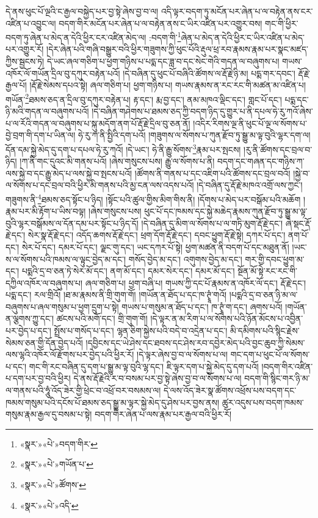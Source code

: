 དེ་ནས་ཕུང་པོ་ལྔའི་ང་རྒྱལ་བསྐྱེད་པར་བྱ་སྟེ་ཞེས་བྱ་བ་ལ། འདི་ལྟར་བདག་ཏུ་མངོན་པར་ཞེན་པ་ལ་བརྟེན་ནས་ངར་འཛིན་པ་འབྱུང་ལ། བདག་གིར་མངོན་པར་ཞེན་པ་ལ་བརྟེན་ནས་ང་ཡིར་འཛིན་པར་འགྱུར་བས། གང་གི་ཕྱིར་བདག་ཏུ་ཞེན་པ་མེད་ན་དེའི་ཕྱིར་ངར་འཛིན་མེད་ལ། :བདག་གི་\footnote{«སྣར་»«པེ་»བདག་གིར་}ཞེན་པ་མེད་ན་དེའི་ཕྱིར་ང་ཡིར་འཛིན་པ་མེད་པར་འགྱུར་རོ། །དེར་ཞེན་པའི་གཞི་བསྒྱུར་བའི་ཕྱིར་གཟུགས་ཀྱི་ཕུང་པོའི་རྡུལ་ཕྲ་རབ་རྣམས་རྣམ་པར་སྣང་མཛད་ཀྱིས་སྦྱངས་ཏེ། དེ་ཡང་ཞལ་གཅིག་པ་ཕྱག་གཉིས་པ་པདྨ་དང་ཟླ་བ་དང་སེང་གེའི་གདན་ལ་བཞུགས་པ། གཡས་འཁོར་ལོ་གཡོན་དྲིལ་བུ་དཀུར་བརྟེན་པའོ། །དེ་བཞིན་དུ་ཕུང་པོ་བཞིའི་ཚོགས་ལ་རྡོ་རྗེ་ཉི་མ། པདྨ་གར་དབང་། རྡོ་རྗེ་རྒྱལ་པོ། །རྡོ་རྗེ་སེམས་དཔའ་སྟེ། ཞལ་གཅིག་པ། ཕྱག་གཉིས་པ། གཡས་རྣམས་ན་རང་རང་གི་མཚན་མ་འཛིན་པ། གཡོན་\footnote{«སྣར་»«པེ་»གཡོན་པ་}ཐམས་ཅད་ན་དྲིལ་བུ་དཀུར་བརྟེན་པ། རྟ་དང་། རྨ་བྱ་དང་། ནམ་མཁའ་ལྡིང་དང་། གླང་པོ་དང་། པདྨ་དང་ཉི་མའི་གདན་ལ་བཞུགས་པའོ། །དེ་བཞིན་གཤེགས་པ་ཐམས་ཅད་ཀྱི་བདག་ཉིད་དུ་གྱུར་པ་ནི་དཔལ་ཧེ་རུ་ཀའོ་ཞེས་པ་ལ་རོའི་གདན་ལ་བཞུགས་པ་སྐུ་མདོག་ནག་པོ་རྡོ་རྗེ་དྲིལ་བུ་ཅན་ནོ། །འདིར་རིགས་ལྔ་ནི་ཕུང་པོ་ལྔ་ལ་སོགས་པ་བྱེ་བྲག་གི་དག་པ་ཡིན་ལ། ཧེ་རུ་ཀ་ནི་སྤྱིའི་དག་པའོ། །གཟུགས་ལ་སོགས་པ་ཀུན་རྫོབ་ཏུ་སྒྱུ་མ་ལྟ་བུའི་ལྷར་དག་ལ། དོན་དམ་སྐྱེ་མེད་དུ་དག་པ་དཔལ་ཧེ་རུ་ཀའོ། །དེ་ཡང་། ཧེ་ནི་རྒྱུ་སོགས་\footnote{«སྣར་»«པེ་»ཚོགས་}རྣམ་པར་སྤངས། །རུ་ནི་ཚོགས་དང་བྲལ་བ་ཉིད། །ཀ་ནི་གང་དུའང་མི་གནས་པའོ། །ཞེས་གསུངས་པས། རྒྱུ་ལ་སོགས་པ་ནི། བདག་དང་གཞན་དང་གཉིས་ཀ་ལས་སྐྱེ་བ་དང་རྒྱུ་མེད་པ་ལས་སྐྱེ་བ་སྤངས་པའོ། །ཚོགས་ནི་གནས་པ་དང་འཇིག་པའི་ཚོགས་དང་བྲལ་བའོ། །སྐྱེ་བ་ལ་སོགས་པ་དང་བྲལ་བའི་ཕྱིར་མི་གནས་པའི་མྱ་ངན་ལས་འདས་པའོ། །དེ་བཞིན་དུ་རྡོ་རྗེ་མཁའ་འགྲོ་ལས་ཀྱང་། གཟུགས་ནི་\footnote{«སྣར་»«པེ་»འདི་}ཐམས་ཅད་སྟོང་པ་ཉིད། །སྟོང་པའི་ཚུལ་གྱིས་མིག་གིས་ནི། །དོགས་པ་མེད་པར་བསྒོམ་པའི་མཆོག །རྣམ་པར་མི་རྟོག་པ་ཡིས་བལྟ། །ཞེས་གསུངས་པས། ཕུང་པོ་དང་ཁམས་དང་སྐྱེ་མཆེད་རྣམས་ཀུན་རྫོབ་ཏུ་སྒྱུ་མ་ལྟ་བུའི་ལྷར་བསྒོམས་ལ་དོན་དམ་པར་སྟོང་པ་ཉིད་དོ། །དེ་བཞིན་དུ་མིག་ལ་སོགས་པ་ལ་གཏི་མུག་རྡོ་རྗེ་དང་། ཞེ་སྡང་རྡོ་རྗེ་དང་། སེར་སྣ་རྡོ་རྗེ་དང་། འདོད་ཆགས་རྡོ་རྗེ་དང་། ཕྲག་དོག་རྡོ་རྗེ་དང་། དབང་ཕྱུག་རྡོ་རྗེ་སྟེ། དཀར་པོ་དང་། ནག་པོ་དང་། སེར་པོ་དང་། དམར་པོ་དང་། ལྗང་གུ་དང་། ཡང་དཀར་པོ་སྟེ། ཕྱག་མཚན་ནི་བདག་པོ་དང་མཐུན་ནོ། །ཡང་ས་ལ་སོགས་པའི་ཁམས་ལ་ལྟུང་བྱེད་མ་དང་། གསོད་བྱེད་མ་དང་། འགུགས་བྱེད་མ་དང་། གར་གྱི་དབང་ཕྱུག་མ་དང་། པདྨའི་དྲ་བ་ཅན་ཏེ་སེར་མོ་དང་། ནག་མོ་དང་། དམར་སེར་དང་། དམར་མོ་དང་། སྔོན་མོ་སྟེ་རང་རང་གི་དཀྱིལ་འཁོར་ལ་བཞུགས་པ། ཞལ་གཅིག་པ། ཕྱག་བཞི་པ། གཡས་ཀྱི་དང་པོ་རྣམས་ན་འཁོར་ལོ་དང་། རྡོ་རྗེ་དང་། པདྨ་དང་། རལ་གྲིའོ། །ཐ་མ་རྣམས་ནི་གྲི་གུག་གོ། །གཡོན་ན་ཐོད་པ་དང་ཁ་ཊྭཱཾ་གའོ། །པདྨའི་དྲ་བ་ཅན་ཉི་མ་ལ་བཞུགས་པ་ཞལ་གསུམ་པ་ཕྱག་དྲུག་པ་སྟེ། གཡས་པ་གསུམ་ན་ཐོད་པ་དང་། ཁ་ཊྭཱཾ་ག་དང་། ཞགས་པའོ། །གཡོན་ན་ལྕགས་ཀྱུ་དང་། ཚངས་པའི་མགོ་དང་། གྲི་གུག་གོ། །དེ་ལྟར་ན་མ་རིག་པ་ལ་སོགས་པའི་ཉོན་མོངས་པ་འབྱིན་པར་བྱེད་པ་དང་། སྤྲོས་པ་གསོད་པ་དང་། ལྷན་ཅིག་སྐྱེས་པའི་བདེ་བ་འདྲེན་པ་དང་། མི་དམིགས་པའི་སྙིང་རྗེས་སེམས་ཅན་གྱི་དོན་བྱེད་པའོ། །དབྱིངས་དང་ཡེ་ཤེས་དང་ཐབས་དང་ཤེས་རབ་དབྱེར་མེད་པའི་བྱང་ཆུབ་ཀྱི་སེམས་ལས་ལྷའི་འཁོར་ལོ་རྫོགས་པར་བྱེད་པའི་ཕྱིར་རོ། །དེ་ལྟར་ཞེས་བྱ་བ་ལ་སོགས་པ་ལ། གང་དག་པ་ཕུང་པོ་ལ་སོགས་པ་དང་། གང་གི་རང་བཞིན་དུ་དག་པ་སྒྱུ་མ་ལྟ་བུའི་ལྷ་དང་། ཇི་ལྟར་དག་པ་སྐྱེ་མེད་དུ་དག་པའོ། །བདག་གིར་འཛིན་པ་དག་པར་བྱ་བའི་ཕྱིར། དེ་ནས་རྡོ་རྗེའི་ར་བ་བསམ་པར་བྱ་སྟེ་ཞེས་བྱ་བ་ལ་སོགས་པ་ལ། བདག་གི་སྙིང་གར་ཉི་མ་ལ་གནས་པའི་ཧཱུཾ་འོད་ཟེར་གྱི་ཕྲེང་བ་འཕྲོ་བར་བསམས་ལ། དེ་ལས་འོད་ཟེར་སྣ་ཚོགས་འཕྲོས་པས་བདག་དང་ཁམས་གསུམ་པའི་དངོས་པོ་ཐམས་ཅད་སྒྱུ་མ་ལྟར་སྐྱེ་མེད་དུ་ཤེས་པར་བྱས་ནས། ཚུར་འདུས་པས་བདག་ཁམས་གསུམ་རྣམ་རྒྱལ་དུ་བསམ་པ་སྟེ། བདག་གིར་ཞེན་པ་ལས་རྣམ་པར་རྒྱལ་བའི་ཕྱིར་རོ། 